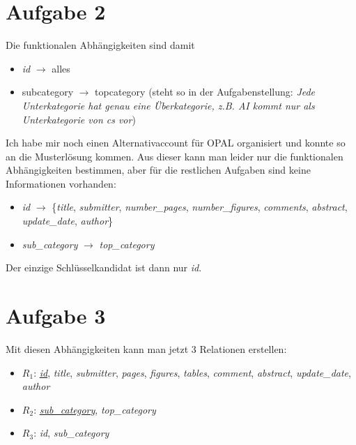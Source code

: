 \documentclass{article}
\begin{document}
	\section*{Aufgabe 2}
	Die funktionalen Abhängigkeiten sind damit
	\begin{itemize}
		\item \textit{id} $\to$ alles
		\item subcategory $\to$ topcategory (steht so in der Aufgabenstellung: \textit{Jede Unterkategorie hat genau eine Überkategorie, z.B. AI kommt nur als Unterkategorie von cs vor})
	\end{itemize}
	Ich habe mir noch einen Alternativaccount für OPAL organisiert und konnte so an die Musterlösung kommen. Aus dieser kann man leider nur die funktionalen Abhängigkeiten bestimmen, aber für die restlichen Aufgaben sind keine Informationen vorhanden:
	\begin{itemize}
		\item \textit{id} $\to$ \{\textit{title}, \textit{submitter}, \textit{number\_pages}, \textit{number\_figures}, \textit{comments}, \textit{abstract}, \textit{update\_date}, \textit{author}\}
		\item \textit{sub\_category} $\to$ \textit{top\_category}
	\end{itemize}
	Der einzige Schlüsselkandidat ist dann nur \textit{id}.

	\section*{Aufgabe 3}
	Mit diesen Abhängigkeiten kann man jetzt 3 Relationen erstellen:
	\begin{itemize}
		\item $R_1$: \underline{\textit{id}}, \textit{title}, \textit{submitter}, \textit{pages}, \textit{figures}, \textit{tables}, \textit{comment}, \textit{abstract}, \textit{update\_date}, \textit{author}
		\item $R_2$: \underline{\textit{sub\_category}}, \textit{top\_category}
		\item $R_3$: \textit{id}, \textit{sub\_category}
	\end{itemize}
	
\end{document}

